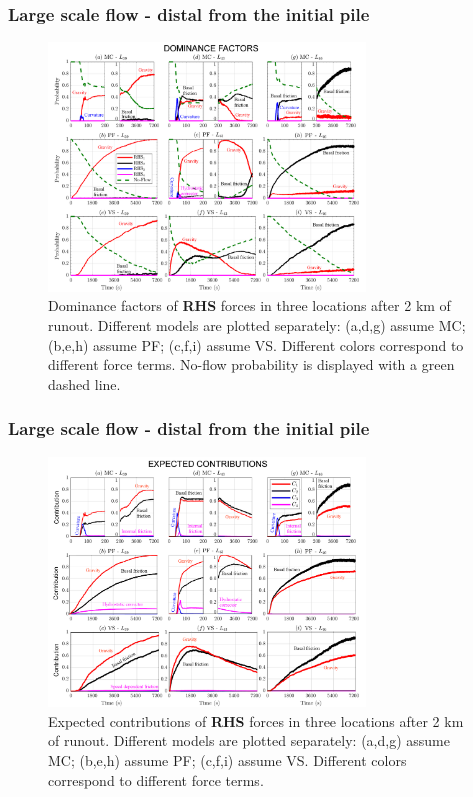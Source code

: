 \documentclass{beamer}
\begin{document}
\begin{frame}
\frametitle{Large scale flow - \small{distal from the initial pile}}
\begin{figure}
        \includegraphics[width=0.75\textwidth]{figures/Colima/Pr2_total.png}
        \caption{Dominance factors of \textbf{RHS} forces in three locations after 2 km of runout. Different models are plotted separately: (a,d,g) assume MC; (b,e,h) assume PF; (c,f,i) assume VS. Different colors correspond to different force terms. No-flow probability is displayed with a green dashed line.}
\end{figure}
\end{frame}

\begin{frame}
\frametitle{Large scale flow - \small{distal from the initial pile}}
\begin{figure}
        \includegraphics[width=0.75\textwidth]{figures/Colima/Ci2_total.png}
        \caption{Expected contributions of \textbf{RHS} forces in three locations after 2 km of runout. Different models are plotted separately: (a,d,g) assume MC; (b,e,h) assume PF; (c,f,i) assume VS. Different colors correspond to different force terms.}
\end{figure}
\end{frame}
\end{document}
